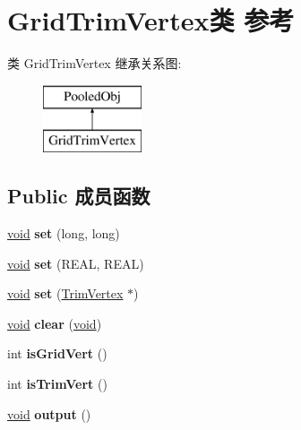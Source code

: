 \hypertarget{class_grid_trim_vertex}{}\section{Grid\+Trim\+Vertex类 参考}
\label{class_grid_trim_vertex}
类 Grid\+Trim\+Vertex 继承关系图\+:\begin{figure}[H]
\begin{center}
\leavevmode
\includegraphics[height=2.000000cm]{class_grid_trim_vertex}
\end{center}
\end{figure}
\subsection*{Public 成员函数}
\begin{DoxyCompactItemize}
\item 
\mbox{\label{class_grid_trim_vertex_ada48f7b25cad38054aff1c0b21d08e3f}} 
\hyperlink{interfacevoid}{void} {\bfseries set} (long, long)
\item 
\mbox{\label{class_grid_trim_vertex_ac82d57fdd816211fa4aa14229e91116d}} 
\hyperlink{interfacevoid}{void} {\bfseries set} (R\+E\+AL, R\+E\+AL)
\item 
\mbox{\label{class_grid_trim_vertex_a5527646d747780ced7eecc78868f2990}} 
\hyperlink{interfacevoid}{void} {\bfseries set} (\hyperlink{class_trim_vertex}{Trim\+Vertex} $\ast$)
\item 
\mbox{\label{class_grid_trim_vertex_a6296e736aa06c482566ff3dd58de8741}} 
\hyperlink{interfacevoid}{void} {\bfseries clear} (\hyperlink{interfacevoid}{void})
\item 
\mbox{\label{class_grid_trim_vertex_a09e21bb93d05b377b7b0056bda66dc88}} 
int {\bfseries is\+Grid\+Vert} ()
\item 
\mbox{\label{class_grid_trim_vertex_a68097221d86db1009bebdf5fcfda3746}} 
int {\bfseries is\+Trim\+Vert} ()
\item 
\mbox{\label{class_grid_trim_vertex_a2375d3bc746a2405a977961e44e3fd16}} 
\hyperlink{interfacevoid}{void} {\bfseries output} ()
\end{DoxyCompactItemize}
